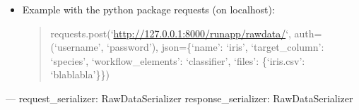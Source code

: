 \documentclass[letterpaper,10pt,english]{sphinxmanual}
\begin{document}
\begin{fulllineitems}
\begin{fulllineitems}
\begin{itemize}
\item {} 
Example with the python package requests (on localhost):
\begin{quote}

requests.post(`\url{http://127.0.0.1:8000/runapp/rawdata/}`,                          auth=(`username', `password'),                          json=\{`name': `iris', `target\_column': `species',                                 `workflow\_elements': `classifier',                                 `files': \{`iris.csv': `blablabla'\}\})
\end{quote}

\end{itemize}

---
request\_serializer: RawDataSerializer
response\_serializer: RawDataSerializer

\end{fulllineitems}


\end{fulllineitems}

\end{document}
